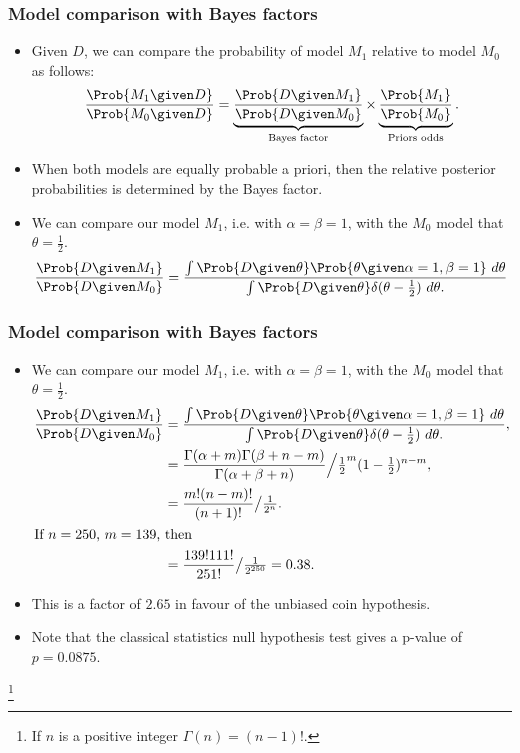 \documentclass{slides}
\begin{document}
\begin{frame}
	\frametitle{Model comparison with Bayes factors}
	\begin{itemize}
		\item Given $D$, we can compare the probability of model $M_1$ relative to model $M_0$ as follows:
			\begin{align*}
				\frac{\Prob{M_1\given D}}{\Prob{M_0\given D}} = 
				\underbrace{\frac{\Prob{D\given M_1}}{\Prob{D\given M_0}}}_{\text{Bayes factor}} \times
				\underbrace{\frac{\Prob{M_1}}{\Prob{M_0}}}_{\text{Priors odds}}. 
			\end{align*}
		\item When both models are equally probable a priori, then the relative posterior probabilities is determined by the Bayes factor.
		\item We can compare our model $M_1$, i.e. with $\alpha = \beta = 1$, with the $M_0$ model that $\theta = \frac{1}{2}$.
			\begin{align*}
				\frac{\Prob{D\given M_1}}{\Prob{D\given M_0}} = \frac{
				\int\Prob{D\given\theta}\Prob{\theta\given\alpha=1,\beta=1}\ d\theta 
				}{
					\int\Prob{D\given\theta} \delta(\theta-\frac{1}{2})\ d\theta.
				}
			\end{align*}
\end{itemize}

	\end{frame} 
	
\begin{frame}
	\frametitle{Model comparison with Bayes factors}
	\begin{itemize}
		\item We can compare our model $M_1$, i.e. with $\alpha = \beta = 1$, with the $M_0$ model that $\theta = \frac{1}{2}$.
			\begin{align*}
				\frac{\Prob{D\given M_1}}{\Prob{D\given M_0}} &= \frac{
				\int\Prob{D\given\theta}\Prob{\theta\given\alpha=1,\beta=1}\ d\theta 
				}{
					\int\Prob{D\given\theta} \delta(\theta-\frac{1}{2})\ d\theta.
				},\\
				&= \frac{\Gamma(\alpha+m)\Gamma(\beta+n-m)}{\Gamma(\alpha+\beta+n)} \Big/ \tfrac{1}{2}^m (1-\tfrac{1}{2})^{n-m},\\
				&= \frac{m!(n-m)!}{(n+1)!} \big/ \tfrac{1}{2^n}.\\
				\intertext{If $n=250$, $m=139$, then}
				&= \frac{139!111!}{251!} \big/ \tfrac{1}{2^{250}} = 0.38.
			\end{align*}
		\item This is a factor of $2.65$ in favour of the unbiased coin hypothesis.
		\item Note that the classical statistics null hypothesis test gives a p-value of $p=0.0875$.
	\end{itemize}
	\let\thefootnote\relax\footnote{If $n$ is a positive integer $\Gamma(n) = (n-1)!$.}
	\end{frame}
\end{document}
